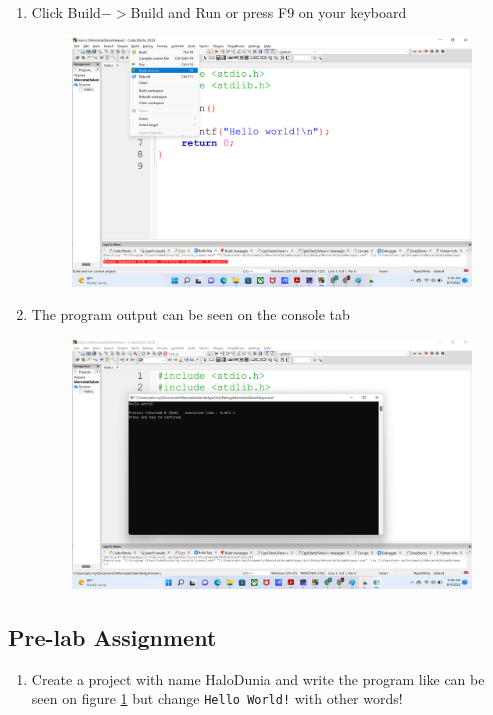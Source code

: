 \begin{enumerate}
\begin{figure}[H]
		      \caption{}
		      \label{fig:screenshot008}
	      \end{figure}
	\item Click Build$->$Build and Run or press F9 on your keyboard
	      \begin{figure}[H]
		      \centering
		      \includegraphics[width=0.7\linewidth]{P1/img/screenshot009.png}
		      \caption{}
		      \label{fig:screenshot009}
	      \end{figure}
	\item The program output can be seen on the console tab
	      \begin{figure}[H]
		      \centering
		      \includegraphics[width=0.7\linewidth]{P1/img/screenshot010.png}
		      \caption{}
		      \label{fig:screenshot010}
	      \end{figure}
\end{enumerate}

\subsection{Pre-lab Assignment}
\begin{enumerate}
	\item Create a project with name HaloDunia and write the program like can be seen on figure \ref{fig:screenshot008} but change \verb|Hello World!| with other words!
\end{enumerate}

